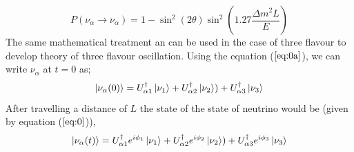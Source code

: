 \documentclass[12pt,a4paper]{report}
\begin{document}
\begin{equation}
\label{eq:9}
P(\nu_{\alpha} \rightarrow \nu_{\alpha}) = 1-\sin^{2}\left(2\theta\right)\sin^{2}\left(1.27\frac{\Delta m^{2} L}{E}\right)
\end{equation}
The same mathematical treatment an can be used in the case of three flavour to develop theory of three flavour oscillation. Using the equation ($\ref{eq:0a}$), we can write $\nu_{\alpha}$ at $t=0$ as;
\begin{equation}
\ket{\nu_{\alpha}(0)}= U_{\alpha 1}^{\dagger}\ket{\nu_{1}}+U_{\alpha 2}^{\dagger}\ket{\nu_{2}})+ U_{\alpha 3}^{\dagger}\ket{\nu_{3}}
\end{equation}
After travelling a distance of $L$ the state of the state of neutrino would be (given by equation ($\ref{eq:0}$)),
\begin{equation}
	\label{eq:10}
	\ket{\nu_{\alpha}(t)} = U_{\alpha 1}^{\dagger} e^{i\phi_{1}}\ket{\nu_{1}}+U_{\alpha 2}^{\dagger}e^{i\phi_{2}}\ket{\nu_{2}})+ U_{\alpha 3}^{\dagger}e^{i\phi_{3}}\ket{\nu_{3}}
\end{equation}
\end{document}
